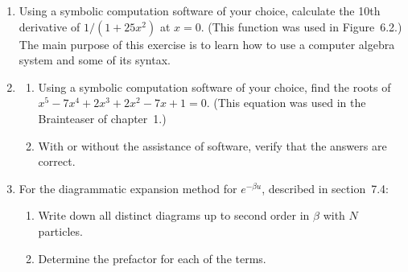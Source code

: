 \documentclass{article}
\begin{document}
\begin{enumerate}
\item 
Using a symbolic computation software of your choice, calculate the 10th derivative of $1/(1+25 x^2)$ at $x=0$. (This function was used in Figure~6.2.)
The main purpose of this exercise is to learn how to use a computer algebra system and some of its syntax.

\item\label{prbl:polysolve}
\begin{enumerate} \setlength{\itemsep}{0pt}
\item Using a symbolic computation software of your choice, find the roots of $x^5 - 7 x^4 + 2 x^3 + 2 x^2 - 7 x + 1 = 0$.
(This equation was used in the Brainteaser of chapter~1.)
\item With or without the assistance of software, verify that the answers are correct.
\end{enumerate}

\item For the diagrammatic expansion method for $e^{-\beta u}$, described in section~7.4: \label{prbl:feynman}
\vspace{-1em}
\begin{enumerate} \setlength{\itemsep}{0pt}
\item Write down all distinct diagrams up to second order in $\beta$ with $N$ particles. 
\item Determine the prefactor for each of the terms.
\end{enumerate}
 
\end{enumerate}
\end{document}
